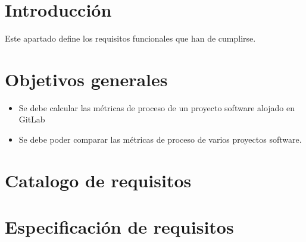 
\section{Introducción}
Este apartado define los requisitos funcionales que han de cumplirse.
\section{Objetivos generales}
\begin{itemize}
	\item Se debe calcular las métricas de proceso de un proyecto software alojado en GitLab
	\item Se debe poder comparar las métricas de proceso de varios proyectos software.
\end{itemize}
\section{Catalogo de requisitos}

\section{Especificación de requisitos}


